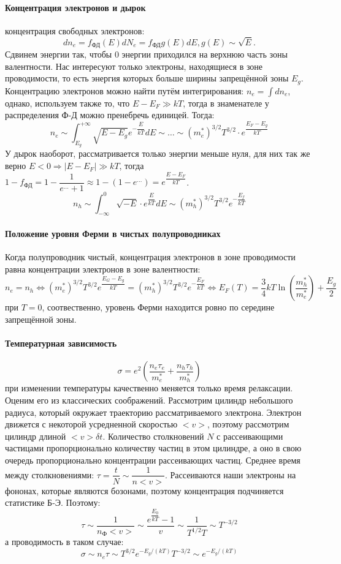 \paragraph{Концентрация электронов и дырок} концентрация свободных электронов:
\[
  dn_e = f_\text{ФД} (E) dN_e = f_\text{ФД} g(E) dE, g(E) \sim \sqrt{E}.
\]
Сдвинем энергии так, чтобы 0 энергии приходился на верхнюю часть зоны валентности. 
Нас интересуют только электроны, находящиеся в зоне проводимости, то есть энергия которых
больше ширины запрещённой зоны $E_g$. Концентрацию электронов можно найти путём интегрирования:
$n_e = \int dn_e$, однако, используем также то, что $E-E_F \gg kT$, тогда в знаменателе у
распределения Ф-Д можно пренебречь единицей. Тогда:
\[
  n_e \sim \int_{E_g}^{+\infty} \sqrt{E-E_g} e^{-\dfrac{E}{kT}} dE \sim \dots
  \sim (m_e^*)^{3/2} T^{3/2} \cdot e^{\dfrac{E_F - E_g}{kT}}
\]
У дырок наоборот, рассматривается только энергии меньше нуля, для них так же верно
$E<0 \Rightarrow |E-E_F| \gg kT$, тогда
$1 - f_\text{ФД} = 1 - \dfrac{1}{e^{\dots} + 1} \approx 1 - \left( 1 - e^{\dots} \right) = e^{\dfrac{E-E_F}{kT}} $. 
\[
  n_h \sim \int_{-\infty}^0 \sqrt{-E} \cdot e^{\dfrac{E}{kT}} dE \sim (m_h^*)^{3/2} T^{3/2} e^{-\dfrac{E_f}{kT}}
\]

\paragraph{Положение уровня Ферми в чистых полупроводниках}

Когда полупроводник чистый, концентрация электронов в зоне проводимости равна концентрации электронов в зоне валентности:
\[
  n_e = n_h \Leftrightarrow (m_e^*)^{3/2} T^{3/2} e^{\dfrac{E_G - E_g}{kT}} = (m_h^*)^{3/2} T^{3/2} e^{-\dfrac{E_F}{kT}} 
  \Leftrightarrow
  E_F(T) = \dfrac{3}{4} kT \ln (\dfrac{m_h^*}{m_e^*}) + \dfrac{E_g}{2}
\]
при $T = 0$, соотвественно, уровень Ферми находится ровно по середине запрещённой зоны.

\paragraph{Температурная зависимость}
\[
  \sigma = e^2 \left( \dfrac{n_e \tau_e}{m_e^*} + \dfrac{n_h \tau_h}{m_h^*} \right) 
\]
при изменении температуры качественно меняется только время релаксации. Оценим его из классических соображений. Рассмотрим цилиндр небольшого радиуса, который окружает траекторию рассматриваемого электрона. Электрон движется с некоторой усредненной скоростью $<v>$, поэтому рассмотрим цилиндр длиной $<v> \delta t$. Количество столкновений $N$ с рассеивающими частицами пропорционально количеству частиц в этом цилиндре, а оно в свою очередь пропорционально концентрации рассеивающих частиц. Среднее время между столкновениями: $\tau = \dfrac{t}{N} \sim \dfrac{1}{n <v>}$. Рассеиваются наши электроны на фононах, которые являются бозонами, поэтому концентрация подчиняется статистике Б-Э. Поэтому:
\[
  \tau \sim \dfrac{1}{n_\text{Ф} <v>} \sim \dfrac{e^{\dfrac{E_0}{kT}} - 1}{v}
  \sim \dfrac{1}{T^{1/2} T} \sim T^{-3/2}
\]
а проводимость в таком случае:
\[
  \sigma \sim n_e \tau \sim T^{3/2} e^{-E_g / (kT)} T^{-3/2} \sim e^{-E_g / (kT)}
\]

